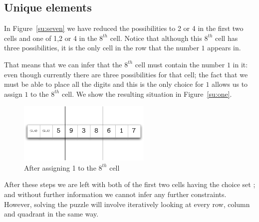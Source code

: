 \subsection{Unique elements}
In Figure~\vref{su:seven} we have reduced the possibilities to 2 or 4 in the first two cells and one of 1,2 or 4 in the $8^{th}$ cell. Notice that although this $8^{th}$ cell has three possibilities, it is the only cell in the row that the number $1$ appears in.

That means that we can infer that the $8^{th}$ cell must contain the number $1$ in it: even though currently there are three possibilities for that cell; the fact that we must be able to place all the digits and this is the only choice for $1$ allows us to assign $1$ to the $8^{th}$ cell. We show the resulting situation in Figure~\vref{su:one}.

\begin{figure}[h]
\centering
\includegraphics[width=2.5in]{one}
\caption{\label{su:one}After assigning 1 to the $8^{th}$ cell}
\end{figure}
\noindent
After these steps we are left with both of the first two cells having the choice set ; and without further information we cannot infer any further constraints. However, solving the puzzle will involve iteratively looking at every row, column and quadrant in the same way.

